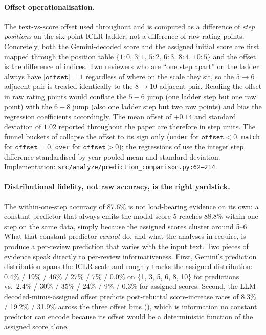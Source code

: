 \documentclass{article}
\newcommand{\code}[1]{\texttt{#1}}
\begin{document}
\paragraph{Offset operationalisation.}
The text-vs-score offset used throughout  and  is computed as a difference of \emph{step positions} on the six-point ICLR ladder, not a difference of raw rating points. Concretely, both the Gemini-decoded score and the assigned initial score are first mapped through the position table $\{1{:}0,\, 3{:}1,\, 5{:}2,\, 6{:}3,\, 8{:}4,\, 10{:}5\}$ and the offset is the difference of indices. Two reviewers who are ``one step apart'' on the ladder always have $|\code{offset}| = 1$ regardless of where on the scale they sit, so the $5 \to 6$ adjacent pair is treated identically to the $8 \to 10$ adjacent pair. Reading the offset in raw rating points would conflate the $5{-}6$ jump (one ladder step but one raw point) with the $6{-}8$ jump (also one ladder step but two raw points) and bias the regression coefficients accordingly. The mean offset of $+0.14$ and standard deviation of $1.02$ reported throughout the paper are therefore in step units. The funnel buckets of  collapse the offset to its sign only (\code{under} for $\code{offset} < 0$, \code{match} for $\code{offset} = 0$, \code{over} for $\code{offset} > 0$); the regressions of  use the integer step difference standardised by year-pooled mean and standard deviation. Implementation: \code{src/analyze/prediction\_comparison.py:62--214}.

\paragraph{Distributional fidelity, not raw accuracy, is the right yardstick.}
The within-one-step accuracy of 87.6\% is not load-bearing evidence on its own: a constant predictor that always emits the modal score 5 reaches 88.8\% within one step on the same data, simply because the assigned scores cluster around 5--6. What that constant predictor \emph{cannot} do, and what the analyses in  require, is produce a per-review prediction that varies with the input text. Two pieces of evidence speak directly to per-review informativeness. First, Gemini's prediction distribution spans the ICLR scale and roughly tracks the assigned distribution: 0.4\% / 19\% / 46\% / 27\% / 7\% / 0.0\% on \{1, 3, 5, 6, 8, 10\} for predictions vs.\ 2.4\% / 30\% / 35\% / 24\% / 9\% / 0.3\% for assigned scores. Second, the LLM-decoded-minus-assigned offset predicts post-rebuttal score-increase rates of 8.3\% / 19.2\% / 31.9\% across the three offset bins (), which is information no constant predictor can encode because its offset would be a deterministic function of the assigned score alone.
\end{document}
